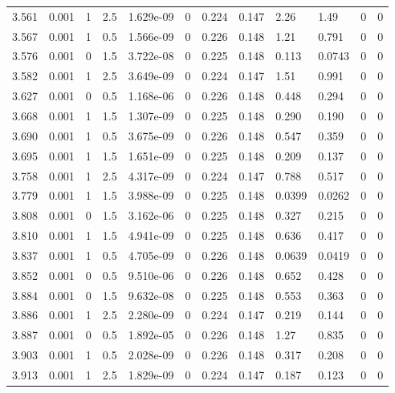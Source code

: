 \documentclass[preview]{standalone}
\begin{document}
{{{\begin{tabular}{L{1.2cm}C{1.2cm} C{0.3cm}C{0.5cm} C{1.4cm}C{1.4cm} C{1.4cm}C{1.4cm} C{1.6cm}C{1.6cm} C{1.6cm}C{1.6cm}}
  3.561  &  0.001  & 1     & 2.5 &  1.629e-09  & 0  &  0.224&   0.147& 2.26 & 1.49   &  0 & 0  \\ 
  3.567  &  0.001  & 1     & 0.5 &  1.566e-09  & 0  &  0.226&   0.148& 1.21 & 0.791   &  0 & 0  \\ 
  3.576  &  0.001  & 0     & 1.5 &  3.722e-08  & 0  &  0.225&   0.148& 0.113 & 0.0743   &  0 & 0  \\ 
  3.582  &  0.001  & 1     & 2.5 &  3.649e-09  & 0  &  0.224&   0.147& 1.51 & 0.991   &  0 & 0  \\ 
  3.627  &  0.001  & 0     & 0.5 &  1.168e-06  & 0  &  0.226&   0.148& 0.448 & 0.294   &  0 & 0  \\ 
  3.668  &  0.001  & 1     & 1.5 &  1.307e-09  & 0  &  0.225&   0.148& 0.290 & 0.190   &  0 & 0  \\ 
  3.690  &  0.001  & 1     & 0.5 &  3.675e-09  & 0  &  0.226&   0.148& 0.547 & 0.359   &  0 & 0  \\ 
  3.695  &  0.001  & 1     & 1.5 &  1.651e-09  & 0  &  0.225&   0.148& 0.209 & 0.137   &  0 & 0  \\ 
  3.758  &  0.001  & 1     & 2.5 &  4.317e-09  & 0  &  0.224&   0.147& 0.788 & 0.517   &  0 & 0  \\ 
  3.779  &  0.001  & 1     & 1.5 &  3.988e-09  & 0  &  0.225&   0.148& 0.0399 & 0.0262   &  0 & 0  \\ 
  3.808  &  0.001  & 0     & 1.5 &  3.162e-06  & 0  &  0.225&   0.148& 0.327 & 0.215   &  0 & 0  \\ 
  3.810  &  0.001  & 1     & 1.5 &  4.941e-09  & 0  &  0.225&   0.148& 0.636 & 0.417   &  0 & 0  \\ 
  3.837  &  0.001  & 1     & 0.5 &  4.705e-09  & 0  &  0.226&   0.148& 0.0639 & 0.0419   &  0 & 0  \\ 
  3.852  &  0.001  & 0     & 0.5 &  9.510e-06  & 0  &  0.226&   0.148& 0.652 & 0.428   &  0 & 0  \\ 
  3.884  &  0.001  & 0     & 1.5 &  9.632e-08  & 0  &  0.225&   0.148& 0.553 & 0.363   &  0 & 0  \\ 
  3.886  &  0.001  & 1     & 2.5 &  2.280e-09  & 0  &  0.224&   0.147& 0.219 & 0.144   &  0 & 0  \\ 
  3.887  &  0.001  & 0     & 0.5 &  1.892e-05  & 0  &  0.226&   0.148& 1.27 & 0.835   &  0 & 0  \\ 
  3.903  &  0.001  & 1     & 0.5 &  2.028e-09  & 0  &  0.226&   0.148& 0.317 & 0.208   &  0 & 0  \\ 
  3.913  &  0.001  & 1     & 2.5 &  1.829e-09  & 0  &  0.224&   0.147& 0.187 & 0.123   &  0 & 0  \\ 

\end{tabular}}}}
\end{document}
